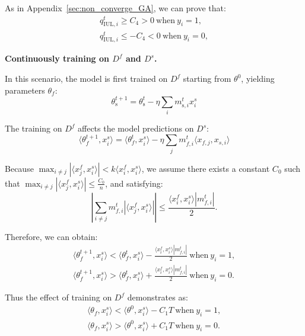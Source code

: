 \documentclass{article}
\theoremstyle{plain}
\theoremstyle{definition}
\theoremstyle{remark}
\begin{document}
As in Appendix~\ref{sec:non_converge_GA}, we can prove that:
\begin{equation}
\begin{aligned}
    q_{\text{IUL},i}^t\geq C_4>0~\text{when}~y_i=1,\\
    q_{\text{IUL},i}^t\leq -C_4<0~\text{when}~y_i=0,
\end{aligned}
\end{equation}

\textbf{Continuously training on $D^f$ and $D^s$.}

In this scenario, the model is first trained on $D^f$ starting from $\theta^0$, yielding parameters $\theta_f$:
\begin{equation}
\theta_\text{s}^{t+1}=\theta_\text{s}^{t}-\eta \sum_i m_{\text{s},i}^t x^s_i
\end{equation}

The training on $D^f$ affects the model predictions on $D^s$:
\begin{equation}
\langle\theta_f^{t+1}, x^s_i\rangle=\langle\theta_f^{t}, x^s_i\rangle-\eta \sum_j m_{f,i}^t\langle x_{f,j},x_{s,i}\rangle
\end{equation}

Because $\max_{i\neq j}|\langle x^f_j,x^s_i\rangle|<k\langle x^f_i,x^s_i\rangle$, we assume there exists a constant $C_0$ such that $\max_{i\neq j}|\langle x^f_j,x^s_i\rangle|\leq \frac{C_0}{n}$, and satisfying:
\begin{equation}
    \left|\sum_{i\neq j}m_{f,i}^t|\langle x^f_j,x^s_i\rangle|\right|\leq\frac{\langle x^f_i,x^s_i\rangle|m_{f,i}^t|}{2}.
\end{equation}

Therefore, we can obtain:
\begin{equation}
\begin{aligned}
    \langle\theta_f^{t+1}, x^s_i\rangle<\langle\theta_f^{t}, x^s_i\rangle-\frac{\langle x^f_i,x^s_i\rangle|m_{f,i}^t|}{2}~\text{when}~y_i=1,\\
    \langle\theta_f^{t+1}, x^s_i\rangle>\langle\theta_f^{t}, x^s_i\rangle+\frac{\langle x^f_i,x^s_i\rangle|m_{f,i}^t|}{2}~\text{when}~y_i=0.
\end{aligned}
\end{equation}

Thus the effect of training on $D^f$ demonstrates as:
\begin{equation}
\begin{aligned}
    \langle\theta_f, x^s_i\rangle<\langle\theta^{0}, x^s_i\rangle-C_1T~\text{when}~y_i=1,\\
    \langle\theta_f, x^s_i\rangle>\langle\theta^{0}, x^s_i\rangle+C_1T~\text{when}~y_i=0.
\label{eq:effect_first}
\end{aligned}
\end{equation}
\end{document}
